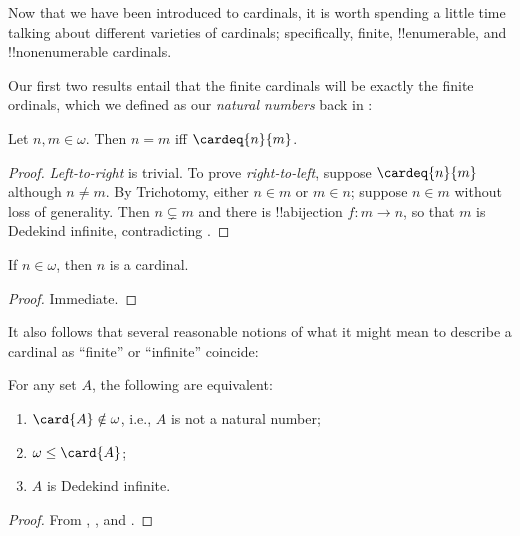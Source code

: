 \documentclass[../../../include/open-logic-section]{subfiles}
\begin{document}

Now that we have been introduced to cardinals, it is worth spending a
little time talking about different varieties of cardinals;
specifically, finite, !!{enumerable}, and !!{nonenumerable} cardinals.

Our first two results entail that the finite cardinals will be exactly
the finite ordinals, which we defined as our \emph{natural numbers}
back in : 

\begin{prop}
Let $n, m \in \omega$. Then $n = m$ iff $\cardeq{n}{m}$.
\end{prop}

\begin{proof}
\emph{Left-to-right} is trivial. To prove \emph{right-to-left},
suppose $\cardeq{n}{m}$ although $n \neq m$. By Trichotomy, either $n
\in m$ or $m \in n$; suppose $n \in m$ without loss of generality.
Then $n \subsetneq m$ and there is !!a{bijection} $f \colon m \to n$,
so that $m$ is Dedekind infinite, contradicting
.
\end{proof}

\begin{cor}
If $n \in \omega$, then $n$ is a cardinal. 
\end{cor}

\begin{proof}
Immediate.
\end{proof}
\noindent
It also follows that several reasonable notions of what it might mean
to describe a cardinal as ``finite'' or ``infinite'' coincide:
\begin{thm}For any set $A$, the following are equivalent:
\begin{enumerate}
	\item{} $\card{A} \notin \omega$, i.e.,
	$A$ is not a natural number;
	\item{} $\omega \leq \card{A}$;
	\item{} $A$ is Dedekind infinite.
\end{enumerate}
\end{thm}

\begin{proof}
From ,
, and
. 
\end{proof}
\end{document}
